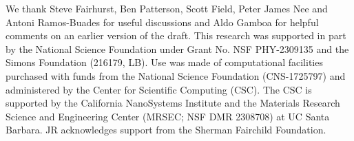 \documentclass[aps,prd,amsmath,floats,floatfix, twocolumn,
superscriptaddress,nofootinbib,showpacs,longbibliography]{revtex4-1}
\begin{document}
\begin{acknowledgments}
We thank Steve Fairhurst, Ben Patterson, Scott Field, Peter James Nee and Antoni Ramos-Buades for useful discussions and Aldo Gamboa for helpful comments on an earlier version of the draft.
This research was supported in part by the National Science Foundation under Grant No. NSF PHY-2309135 and the Simons Foundation (216179, LB). 
Use was made of computational facilities purchased with funds from the National Science Foundation (CNS-1725797) and administered by the Center for Scientific Computing (CSC). The CSC is supported by the California NanoSystems Institute and the Materials Research Science and Engineering Center (MRSEC; NSF DMR 2308708) at UC Santa Barbara.
JR acknowledges support from the Sherman Fairchild Foundation.
\end{acknowledgments}


\end{document}
